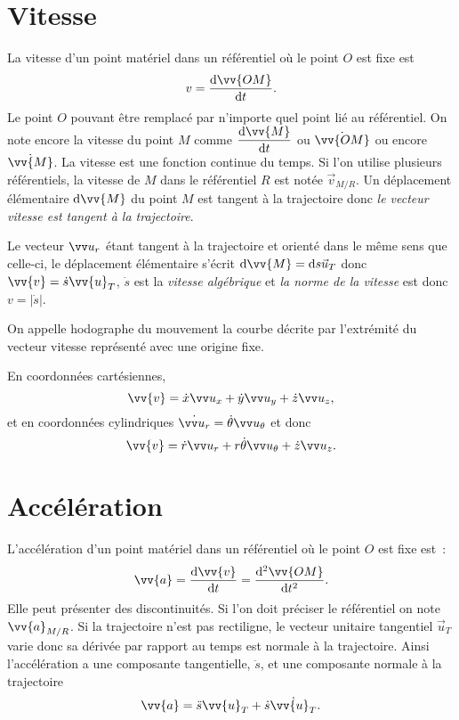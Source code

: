 \section{Vitesse}%
\label{chap1-sec:vitesse}%

La vitesse d'un point matériel dans un référentiel où le point \(O\) est fixe 
est
\begin{equation}%
  v = \derived{\vv{OM}}{t}.
\end{equation}%
Le point \(O\) pouvant être remplacé par n'importe quel point lié au 
référentiel. On note encore la vitesse du point \(M\) comme 
\(\derived{\vv{M}}{t}\) ou \(\dot{\vv{OM}}\) ou encore \(\dot{\vv{M}}\). La 
vitesse est une fonction continue du temps. Si l'on utilise plusieurs 
référentiels, la vitesse de \(M\) dans le référentiel \(R\) est notée 
\(\vec{v}_{M/R}\). Un déplacement élémentaire \(\D \vv{M}\) du point \(M\) est 
tangent à la trajectoire donc \emph{le vecteur vitesse est tangent à la 
trajectoire}.

Le vecteur \(\ur\) étant tangent à la trajectoire et orienté dans le même sens 
que celle-ci, le déplacement élémentaire s'écrit \(\D \vv{M}=\D s \vec{u}_T\) 
donc \(\vv{v}=\dot{s} \vv{u}_T\), \(\dot{s}\) est la \emph{vitesse algébrique} 
et \emph{la norme de la vitesse} est donc \(v=|\dot{s}|\).

On appelle hodographe du mouvement la courbe décrite par l'extrémité du 
vecteur vitesse représenté avec une origine fixe.

En coordonnées cartésiennes,
\begin{equation}%
  \vv{v} = \dot{x}\ux+\dot{y}\uy+\dot{z}\uz,%
\end{equation}%
et en coordonnées cylindriques \(\dot{\ur}=\dot{\theta}\utheta\) et donc
\begin{equation}%
  \vv{v}=\dot{r}\ur+r\dot{\theta}\utheta+\dot{z}\uz.%
\end{equation}%

\section{Accélération}%
\label{chap1-sec:accélération}%

L'accélération d'un point matériel dans un référentiel où le point \(O\) est 
fixe est~:
\begin{equation}%
  \vv{a}=\derived{\vv{v}}{t}=\deriveds{\vv{OM}}{t}.%
\end{equation}%
Elle peut présenter des discontinuités. Si l'on doit préciser le référentiel 
on note \(\vv{a}_{M/R}\). Si la trajectoire n'est pas rectiligne, le vecteur 
unitaire tangentiel \(\vec{u}_T\) varie donc sa dérivée par rapport au temps 
est normale à la trajectoire. Ainsi l'accélération a une composante 
tangentielle, \(\ddot{s}\), et une composante normale à la trajectoire
\begin{equation}%
  \vv{a}=\ddot{s}\vv{u}_T + \dot{s}\dot{\vv{u}_T}.%
\end{equation}%


